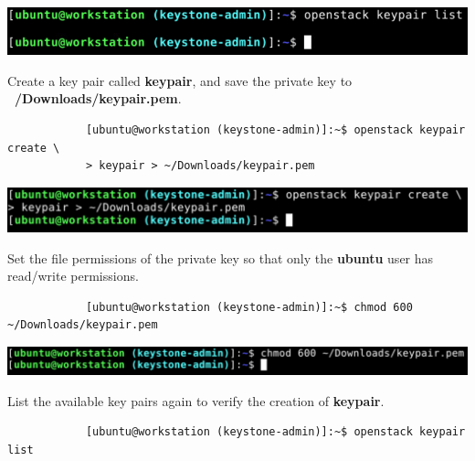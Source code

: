 \documentclass[letterpaper, 12pt]{article}
\begin{document}
\begin{enumerate}
\begin{labstep}
        \begin{center}
            \includegraphics[width=\linewidth]{images/part5/step29.png}
        \end{center}
    \end{labstep}

    \begin{labstep}
        Create a key pair called \textbf{keypair}, and save the private key to \textbf{~/Downloads/keypair.pem}.
        \begin{lstlisting}
            [ubuntu@workstation (keystone-admin)]:~$ openstack keypair create \
            > keypair > ~/Downloads/keypair.pem
        \end{lstlisting}

        \begin{center}
            \includegraphics[width=\linewidth]{images/part5/step30.png}
        \end{center}
    \end{labstep}

    \begin{labstep}
        Set the file permissions of the private key so that only the \textbf{ubuntu} user has read/write permissions.
        \begin{lstlisting}
            [ubuntu@workstation (keystone-admin)]:~$ chmod 600 ~/Downloads/keypair.pem
        \end{lstlisting}

        \begin{center}
            \includegraphics[width=\linewidth]{images/part5/step31.png}
        \end{center}
    \end{labstep}

    \begin{labstep}
        List the available key pairs again to verify the creation of \textbf{keypair}.
        \begin{lstlisting}
            [ubuntu@workstation (keystone-admin)]:~$ openstack keypair list
        \end{lstlisting}


\end{labstep}
\end{enumerate}
\end{document}

